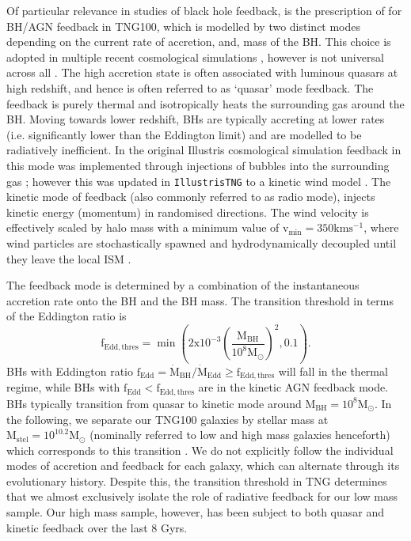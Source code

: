 Of particular relevance in studies of black hole feedback, is the prescription of \citet{weinberger17} for BH/AGN feedback in TNG100, which is modelled by two distinct modes depending on the current rate of accretion, and, mass of the BH. This choice is adopted in multiple recent cosmological simulations \citep[][]{sijacki2007, dubois2014}, however is not universal across all \citep[e.g.][]{schaye2015}. The high accretion state is often associated with luminous quasars at high redshift, and hence is often referred to as `quasar' mode feedback. The feedback is purely thermal and isotropically heats the surrounding gas around the BH. Moving towards lower redshift, BHs are typically accreting at lower rates (i.e. significantly lower than the Eddington limit) and are modelled to be radiatively inefficient. In the original Illustris cosmological simulation feedback in this mode was implemented through injections of bubbles into the surrounding gas \citep{sijacki2007}; however this was updated in \texttt{IllustrisTNG}  to a kinetic wind model \citep{weinberger17}. The kinetic mode of feedback (also commonly referred to as radio mode), injects kinetic energy (momentum) in randomised directions. The wind velocity is effectively scaled by halo mass \citep[see Appendix 1 in ][]{weinberger17} with a minimum value of $\mathrm{v_{min} = 350 km s^{-1}}$, where wind particles are stochastically spawned and hydrodynamically decoupled until they leave the local ISM \citep[see;][ for more information]{pillepich18a}. 

The feedback mode is determined by a combination of the instantaneous accretion rate onto the BH and the BH mass. The transition threshold in terms of the Eddington ratio is 
\begin{equation}
\mathrm{f_{Edd, thres}= \min \left( 2x10^{-3}\left(\frac{M_{BH}}{10^8 M_{\odot}}\right)^2 , 0.1 \right)}.
\end{equation}
BHs with Eddington ratio $\mathrm{f_{Edd} = \dot{M}_{BH} / \dot{M}_{Edd} \geq f_{Edd,thres}}$ will fall in the thermal regime, while BHs with $\mathrm{f_{Edd} < f_{Edd,thres}}$ are in the kinetic AGN feedback mode. BHs typically transition from quasar to kinetic mode around $\mathrm{M_{BH} = 10^{8}M_{\odot}}$. In the following, we separate our TNG100 galaxies by stellar mass at $\mathrm{M_{stel} = 10^{10.2}M_{\odot}}$ (nominally referred to low and high mass galaxies henceforth) which corresponds to this transition \citep[i.e. $\mathrm{M_{BH} \approx 10^{8}M_{\odot}}$, see Fig 1 in][]{li2019}. We do not explicitly follow the individual modes of accretion and feedback for each galaxy, which can alternate through its evolutionary history. Despite this, the transition threshold in TNG determines that we almost exclusively isolate the role of radiative feedback for our low mass sample. Our high mass sample, however, has been subject to both quasar and kinetic feedback over the last 8 Gyrs. 

